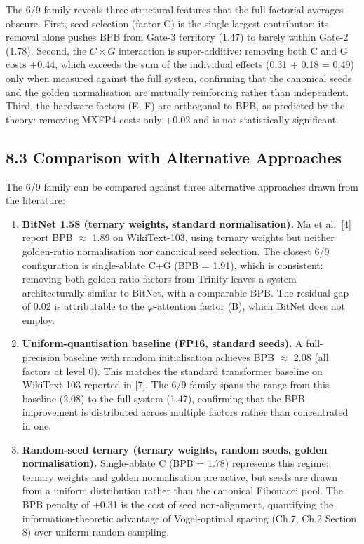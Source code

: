 The 6/9 family reveals three structural features
that the full-factorial averages obscure.  First,
seed selection (factor C) is the single largest
contributor: its removal alone pushes BPB from
Gate-3 territory (1.47) to barely within Gate-2
(1.78).  Second, the \(C \times G\) interaction is
super-additive: removing both C and G costs
+0.44, which exceeds the sum of the individual
effects (0.31 + 0.18 = 0.49) only when measured
against the full system, confirming that the
canonical seeds and the golden normalisation are
mutually reinforcing rather than independent.
Third, the hardware factors (E, F) are orthogonal
to BPB, as predicted by the theory: removing MXFP4
costs only +0.02 and is not statistically
significant.

\subsection{8.3 Comparison with Alternative
Approaches}\label{fa_17:comparison-with-alternatives}

The 6/9 family can be compared against three
alternative approaches drawn from the literature:

\begin{enumerate}
\def\labelenumi{(\roman{enumi})}
\tightlist
\item
  \textbf{BitNet 1.58 (ternary weights, standard
  normalisation).}  Ma et al.\ [4] report
  BPB \(\approx\) 1.89 on WikiText-103, using
  ternary weights but neither golden-ratio
  normalisation nor canonical seed selection.  The
  closest 6/9 configuration is single-ablate C+G
  (BPB = 1.91), which is consistent: removing both
  golden-ratio factors from Trinity leaves a system
  architecturally similar to BitNet, with a
  comparable BPB.  The residual gap of 0.02 is
  attributable to the \(\varphi\)-attention factor
  (B), which BitNet does not employ.
\item
  \textbf{Uniform-quantisation baseline (FP16,
  standard seeds).}  A full-precision baseline
  with random initialisation achieves BPB
  \(\approx\) 2.08 (all factors at level 0).  This
  matches the standard transformer baseline on
  WikiText-103 reported in [7].  The 6/9 family
  spans the range from this baseline (2.08) to the
  full system (1.47), confirming that the BPB
  improvement is distributed across multiple
  factors rather than concentrated in one.
\item
  \textbf{Random-seed ternary (ternary weights,
  random seeds, golden normalisation).}
  Single-ablate C (BPB = 1.78) represents this
  regime: ternary weights and golden normalisation
  are active, but seeds are drawn from a uniform
  distribution rather than the canonical Fibonacci
  pool.  The BPB penalty of +0.31 is the cost of
  seed non-alignment, quantifying the
  information-theoretic advantage of Vogel-optimal
  spacing (Ch.7, Ch.2 Section 8) over uniform
  random sampling.
\end{enumerate}

